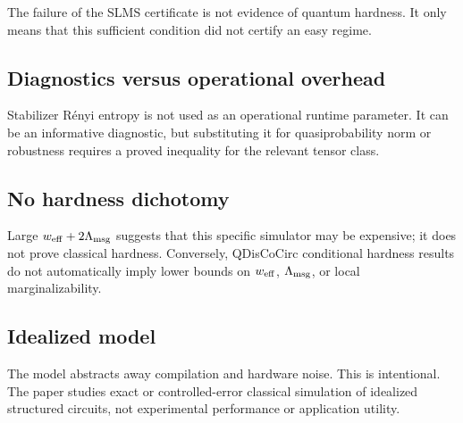The failure of the SLMS certificate is not evidence of quantum hardness. It only means that this sufficient condition did not certify an easy regime.

\subsection{Diagnostics versus operational overhead}

Stabilizer R\'enyi entropy is not used as an operational runtime parameter. It can be an informative diagnostic, but substituting it for quasiprobability norm or robustness requires a proved inequality for the relevant tensor class.

\subsection{No hardness dichotomy}

Large \(w_{\mathrm{eff}}+2\Lambda_{\mathrm{msg}}\) suggests that this specific simulator may be expensive; it does not prove classical hardness. Conversely, QDisCoCirc conditional hardness results do not automatically imply lower bounds on \(w_{\mathrm{eff}}\), \(\Lambda_{\mathrm{msg}}\), or local marginalizability.

\subsection{Idealized model}

The model abstracts away compilation and hardware noise. This is intentional. The paper studies exact or controlled-error classical simulation of idealized structured circuits, not experimental performance or application utility.
